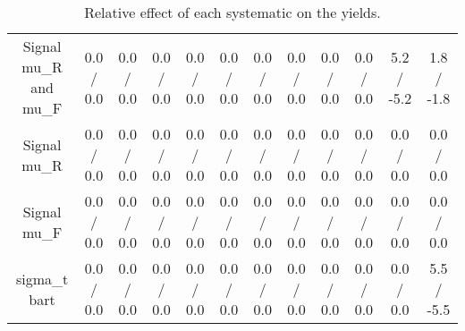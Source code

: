 \begin{table}[htbp]
\begin{center}
\begin{tabular}{|c|c|c|c|c|c|c|c|c|c|c|c|}
  Signal  mu_{R} and  mu_{F} & 0.0 / 0.0 & 0.0 / 0.0 & 0.0 / 0.0 & 0.0 / 0.0 & 0.0 / 0.0 & 0.0 / 0.0 & 0.0 / 0.0 & 0.0 / 0.0 & 0.0 / 0.0 & 5.2 / -5.2 & 1.8 / -1.8 \\ 
  Signal  mu_{R} & 0.0 / 0.0 & 0.0 / 0.0 & 0.0 / 0.0 & 0.0 / 0.0 & 0.0 / 0.0 & 0.0 / 0.0 & 0.0 / 0.0 & 0.0 / 0.0 & 0.0 / 0.0 & 0.0 / 0.0 & 0.0 / 0.0 \\ 
  Signal  mu_{F} & 0.0 / 0.0 & 0.0 / 0.0 & 0.0 / 0.0 & 0.0 / 0.0 & 0.0 / 0.0 & 0.0 / 0.0 & 0.0 / 0.0 & 0.0 / 0.0 & 0.0 / 0.0 & 0.0 / 0.0 & 0.0 / 0.0 \\ 
   sigma_{t bar{t}} & 0.0 / 0.0 & 0.0 / 0.0 & 0.0 / 0.0 & 0.0 / 0.0 & 0.0 / 0.0 & 0.0 / 0.0 & 0.0 / 0.0 & 0.0 / 0.0 & 0.0 / 0.0 & 0.0 / 0.0 & 5.5 / -5.5 \\ 
\hline 
\end{tabular} 
\caption{Relative effect of each systematic on the yields.} 
\end{center} 
\end{table} 
